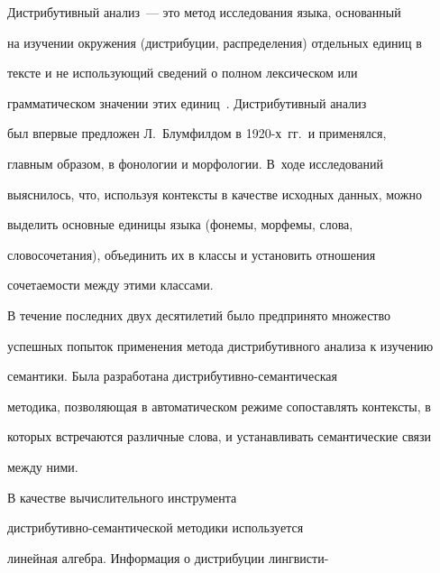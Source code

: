      Дистрибутивный анализ~--- это метод исследования языка, основанный


на изучении окружения (дистрибуции, распределения) отдельных единиц в


тексте и не использующий сведений о полном лексическом или


грамматическом значении этих единиц~\cite{7-m}. Дистрибутивный анализ


был впервые предложен Л.~Блумфилдом в 1920-х~гг.\ и применялся,


главным образом, в фонологии и морфологии. В~ходе исследований


выяснилось, что, используя контексты в качестве исходных данных, можно


выделить основные единицы языка (фонемы, морфемы, слова,


словосочетания), объединить их в классы и установить отношения


сочетаемости между этими классами.





     В течение последних двух десятилетий было предпринято множество


успешных попыток применения метода дистрибутивного анализа к изучению


семантики. Была разработана дис\-три\-бу\-тив\-но-се\-ман\-ти\-че\-ская


методика, позволяющая в автоматическом режиме сопоставлять контексты, в


которых встречаются различные слова, и устанавливать семантические связи


между ними.














     В качестве вычислительного инструмента


     ди\-стри\-бу\-тив\-но-се\-ман\-ти\-че\-ской методики используется


линейная алгебра. Информация о дистрибуции лингвисти-\linebreak\vspace*{-12pt}


